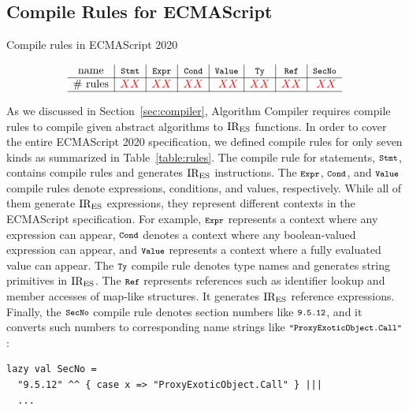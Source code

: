 \subsection{Compile Rules for ECMAScript}

\begin{table}[t]
  \centering
  \caption{Compile rules in ECMAScript 2020}
  \label{table:rules}
\vspace*{-1em}
  \[
    \begin{array}{c|r|r|r|r|r|r|r}
      \text{name}
      & \multicolumn{1}{c|}{\code{Stmt}}
      & \multicolumn{1}{c|}{\code{Expr}}
      & \multicolumn{1}{c|}{\code{Cond}}
      & \multicolumn{1}{c|}{\code{Value}}
      & \multicolumn{1}{c|}{\code{Ty}}
      & \multicolumn{1}{c|}{\code{Ref}}
      & \multicolumn{1}{c}{\code{SecNo}}\\\hline
      \text{\# rules}
      & \inred{XX}
      & \inred{XX}
      & \inred{XX}
      & \inred{XX}
      & \inred{XX}
      & \inred{XX}
      & \inred{XX}\\\hline
    \end{array}
  \]
\end{table}

As we discussed in Section~\ref{sec:compiler}, \textsf{Algorithm Compiler}
requires compile rules to compile given abstract algorithms to \( \text{IR}_\text{ES} \)
functions.  In order to cover the entire ECMAScript 2020 specification,
we defined compile rules for only seven kinds as summarized in
Table~\ref{table:rules}.  The compile rule for statements, \( \texttt{\footnotesize Stmt} \),
contains  compile rules and generates \( \text{IR}_\text{ES} \) instructions.
The \( \texttt{\footnotesize Expr} \), \( \texttt{\footnotesize Cond} \), and \( \texttt{\footnotesize Value} \) compile
rules denote expressions, conditions, and values, respectively.  While
all of them generate \( \text{IR}_\text{ES} \) expressions, they represent different
contexts in the ECMAScript specification.  For example,
\( \texttt{\footnotesize Expr} \) represents a context where any expression can appear,
\( \texttt{\footnotesize Cond} \) denotes a context where any boolean-valued expression
can appear, and \( \texttt{\footnotesize Value} \) represents a context where a fully
evaluated value can appear.  The \( \texttt{\footnotesize Ty} \) compile rule denotes
type names and generates string primitives in \( \text{IR}_\text{ES} \).  The \( \texttt{\footnotesize Ref} \)
represents references such as identifier lookup and member accesses of
map-like structures.  It generates \( \text{IR}_\text{ES} \) reference expressions.
Finally, the \( \texttt{\footnotesize SecNo} \) compile rule denotes section numbers
like \( \texttt{\footnotesize9.5.12} \), and it converts such numbers to
corresponding name strings like \( \texttt{\footnotesize"ProxyExoticObject.Call"} \):
\begin{lstlisting}[style=myScalastyle]
lazy val SecNo =
  "9.5.12" ^^ { case x => "ProxyExoticObject.Call" } |||
  ...
\end{lstlisting}

